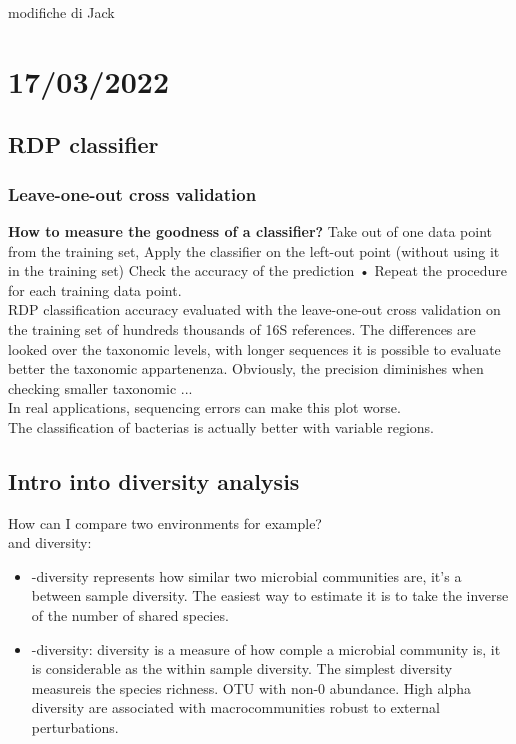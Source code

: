 \graphicspath{{chapters/images/06}}

modifiche di Jack

\chapter{17/03/2022}

\section{RDP classifier}

\subsection{Leave-one-out cross validation}

\textbf{How to measure the goodness of a classifier?}
Take out of one data point from the training set,  Apply the classifier on the left-out point (without using it in the training set) Check the accuracy of the prediction
• Repeat the procedure for each training data point. 
\\
RDP classification accuracy evaluated with the leave-one-out
cross validation on the training set of hundreds thousands of 16S
references. The differences are looked over the taxonomic levels, with longer sequences it is possible to evaluate better the taxonomic appartenenza. Obviously, the precision diminishes when checking smaller taxonomic ... %
\\
In real applications, sequencing errors can make this plot worse. 
\\
The classification of bacterias is actually better with variable regions. 

\section{Intro into diversity analysis}

How can I compare two environments for example?
\\
\alpha and \beta diversity: 

\begin{itemize}
	\item \beta -diversity represents how similar two microbial communities are, it's a between sample diversity. The easiest way to estimate it is to take the inverse of the number of shared species.  
	\item \alpha -diversity:  diversity is a measure of how comple a microbial community is, it is considerable as the within sample diversity. The simplest \alpha diversity measureis the species richness. OTU with non-0 abundance. High alpha diversity are associated with macrocommunities robust to external perturbations. 
\end{itemize}

